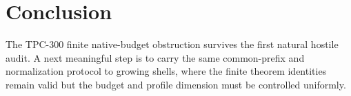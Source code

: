 \documentclass[11pt]{article}
\begin{document}
\section*{Conclusion}

The TPC-300 finite native-budget obstruction survives the first natural
hostile audit.  A next meaningful step is to carry the same common-prefix
and normalization protocol to growing shells, where the finite theorem
identities remain valid but the budget and profile dimension must be
controlled uniformly.



\end{document}
